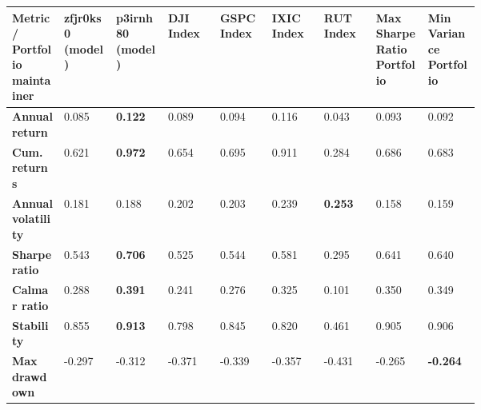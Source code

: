 \documentclass[../xlapes02]{subfiles}
\begin{document}
    \begin{table}[H]
        \centering
        {\footnotesize\begin{tabular}{*{9}{|m{0.075\linewidth}|}}
                          \toprule
                          \bfseries Metric / Portfolio maintainer & \bfseries zfjr0ks0 (model) & \bfseries p3irnh80 (model)           & \bfseries DJI Index                   & \bfseries GSPC Index & \bfseries IXIC Index & \bfseries RUT Index & \bfseries Max Sharpe Ratio Portfolio & \bfseries Min Variance Portfolio \\[0.4cm]
                          \midrule
                          \bfseries Annual return                 & 0.085                      & \color[HTML]{00F000} \bfseries 0.122 & 0.089                                 & 0.094                & 0.116 & 0.043 & 0.093 & 0.092 \\[0.4cm]
                          \bfseries Cum.\ returns                 & 0.621                      & \color[HTML]{00F000} \bfseries 0.972 & 0.654                                 & 0.695                & 0.911 & 0.284 & 0.686 & 0.683 \\[0.4cm]
                          \bfseries Annual volatility             & 0.181                      & 0.188                                & 0.202                                 & 0.203                & 0.239                & \color[HTML]{00F000} \bfseries 0.253 & 0.158 & 0.159 \\[0.4cm]
                          \bfseries Sharpe ratio                  & 0.543                      & \color[HTML]{00F000} \bfseries 0.706 & 0.525                                 & 0.544                & 0.581 & 0.295 & 0.641 & 0.640 \\[0.4cm]
                          \bfseries Calmar ratio                  & 0.288                      & \color[HTML]{00F000} \bfseries 0.391 & 0.241                                 & 0.276                & 0.325 & 0.101 & 0.350 & 0.349 \\[0.4cm]
                          \bfseries Stability                     & 0.855                      & \color[HTML]{00F000} \bfseries 0.913 & 0.798                                 & 0.845                & 0.820 & 0.461 & 0.905 & 0.906 \\[0.4cm]
                          \bfseries Max drawdown                  & -0.297                     & -0.312                               & -0.371                                & -0.339               & -0.357               & -0.431                               & -0.265                               & \color[HTML]{00F000} \bfseries -0.264 \\[0.4cm]

\end{tabular}}
\end{table}
\end{document}
